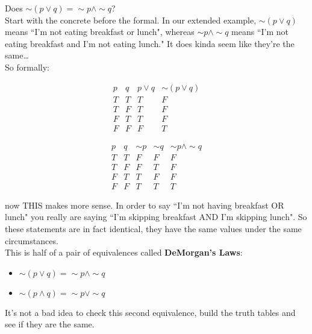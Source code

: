 \begin{example}
Does $\sim(p \vee q)=\sim p \wedge \sim q$?\\

Start with the concrete before the formal.  In our extended example, $\sim(p\vee q)$ means ``I'm not eating breakfast or lunch", whereas $\sim p \wedge \sim q$ means ``I'm not eating breakfast and I'm not eating lunch."  It does kinda seem like they're the same\ldots\\

So formally:

$$\begin{array}{c|c|c|c}
p&q&p\vee q& \sim (p\vee q)\\
\hline
T & T&T&F\\
T&F&T&F\\
F&T&T&F\\
F&F&F&T
\end{array}$$

$$\begin{array}{c|c|c|c|c}
p&q&\sim p& \sim q & \sim p \wedge \sim q\\
\hline
T & T&F&F&F\\
T&F&F&T&F\\
F&T&T&F&F\\
F&F&T&T&T
\end{array}$$

now THIS makes more sense.  In order to say ``I'm not having breakfast OR lunch"  you really are saying ``I'm skipping breakfast AND I'm skipping lunch".  So these statements are in fact identical, they have the same values under the same circumstances.\\

This is half of a pair of equivalences called \textbf{DeMorgan's Laws}:

\begin{itemize}
\item $\sim(p \vee q)=\sim p \wedge \sim q$
\item $\sim(p \wedge q)=\sim p \vee \sim q$
\end{itemize}

It's not a bad idea to check this second equivalence, build the truth tables and see if they are the same.

\end{example}



